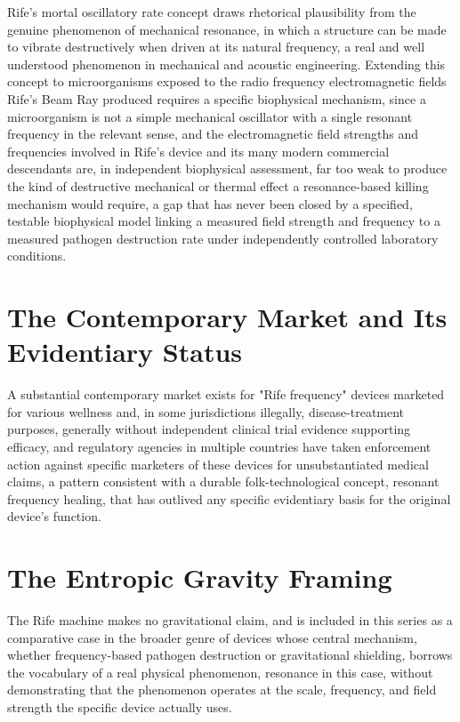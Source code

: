 \documentclass[11pt]{article}
\begin{document}
Rife's mortal oscillatory rate concept draws rhetorical plausibility from the genuine phenomenon of mechanical resonance, in which a structure can be made to vibrate destructively when driven at its natural frequency, a real and well understood phenomenon in mechanical and acoustic engineering. Extending this concept to microorganisms exposed to the radio frequency electromagnetic fields Rife's Beam Ray produced requires a specific biophysical mechanism, since a microorganism is not a simple mechanical oscillator with a single resonant frequency in the relevant sense, and the electromagnetic field strengths and frequencies involved in Rife's device and its many modern commercial descendants are, in independent biophysical assessment, far too weak to produce the kind of destructive mechanical or thermal effect a resonance-based killing mechanism would require, a gap that has never been closed by a specified, testable biophysical model linking a measured field strength and frequency to a measured pathogen destruction rate under independently controlled laboratory conditions.

\section{The Contemporary Market and Its Evidentiary Status}

A substantial contemporary market exists for "Rife frequency" devices marketed for various wellness and, in some jurisdictions illegally, disease-treatment purposes, generally without independent clinical trial evidence supporting efficacy, and regulatory agencies in multiple countries have taken enforcement action against specific marketers of these devices for unsubstantiated medical claims, a pattern consistent with a durable folk-technological concept, resonant frequency healing, that has outlived any specific evidentiary basis for the original device's function.

\section{The Entropic Gravity Framing}

The Rife machine makes no gravitational claim, and is included in this series as a comparative case in the broader genre of devices whose central mechanism, whether frequency-based pathogen destruction or gravitational shielding, borrows the vocabulary of a real physical phenomenon, resonance in this case, without demonstrating that the phenomenon operates at the scale, frequency, and field strength the specific device actually uses.
\end{document}
